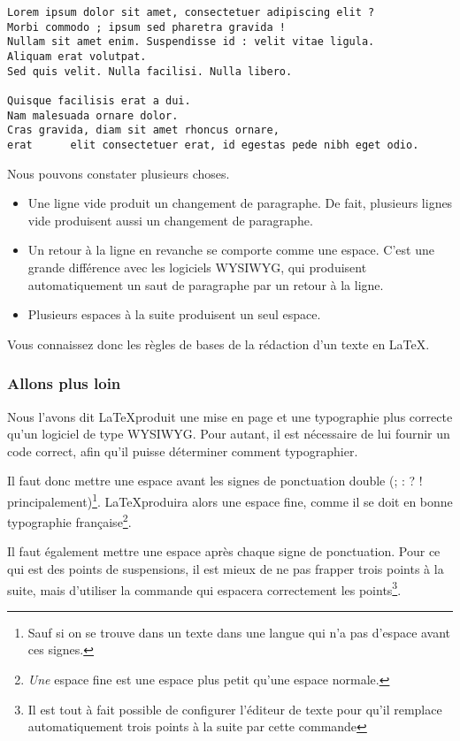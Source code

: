 \begin{verbatim}
Lorem ipsum dolor sit amet, consectetuer adipiscing elit ?
Morbi commodo ; ipsum sed pharetra gravida !
Nullam sit amet enim. Suspendisse id : velit vitae ligula.
Aliquam erat volutpat.
Sed quis velit. Nulla facilisi. Nulla libero. 

Quisque facilisis erat a dui.
Nam malesuada ornare dolor.
Cras gravida, diam sit amet rhoncus ornare, 
erat      elit consectetuer erat, id egestas pede nibh eget odio.
\end{verbatim}


Nous pouvons constater plusieurs choses.
\begin{itemize}
\item Une ligne vide produit un changement de paragraphe. De fait, plusieurs lignes vide produisent aussi un changement de paragraphe.
\item Un retour à la ligne en revanche se comporte comme une espace. C'est une grande différence avec les logiciels WYSIWYG, qui produisent automatiquement un saut de paragraphe par un retour à la ligne.
\item Plusieurs espaces à la suite produisent un seul espace. 
\end{itemize}

Vous connaissez donc les règles de bases de la rédaction d'un texte en \LaTeX.

\subsubsection{Allons plus loin}


Nous l'avons dit \LaTeX produit une mise en page et une typographie plus correcte qu'un logiciel de type WYSIWYG. Pour autant, il est nécessaire de lui fournir un code correct, afin qu'il puisse déterminer comment typographier.

Il faut donc mettre une espace avant les signes de ponctuation double (; : ? ! principalement)\footnote{Sauf si on se trouve dans un texte dans une langue qui n'a pas d'espace avant ces signes.}. \LaTeX produira alors une espace fine, comme il se doit en bonne typographie fran\c caise\footnote{\emph{Une} espace fine est une espace plus petit qu'une espace normale.}.

Il faut également mettre une espace après chaque signe de ponctuation. Pour ce qui est des points de suspensions, il est mieux de ne pas frapper trois points à la suite, mais d'utiliser la commande  qui espacera correctement les points\footnote{Il est tout à fait possible de configurer l'éditeur de texte pour qu'il remplace automatiquement trois points à la suite par cette commande}.

